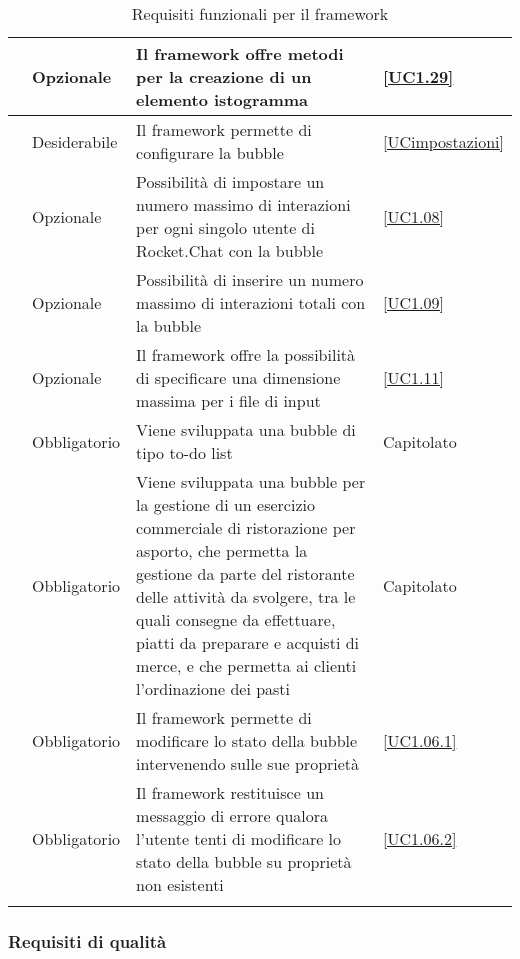 \begin{longtable}{|P{1.5cm}|P{2.5cm}|P{6.5cm}|P{2.5cm}|}
	\hline \RequisitoOpF\label{L64} & Opzionale & Il framework offre metodi per la creazione di un elemento istogramma &\ref{UC1.29} \\	 	 
	\hline \RequisitoDF\label{L93} & Desiderabile & Il framework permette di configurare la bubble & \ref{UCimpostazioni} \\
	\hline \RequisitoOpF\label{L47} & Opzionale & Possibilità di impostare un numero massimo di interazioni per ogni singolo utente di Rocket.Chat con la bubble & \ref{UC1.08} \\
	\hline \RequisitoOpF\label{L48} & Opzionale & Possibilità di inserire un numero massimo di interazioni totali con la bubble & \ref{UC1.09} \\
	\hline \RequisitoOpF\label{L49} & Opzionale & Il framework offre la possibilità di specificare una dimensione massima per i file di input & \ref{UC1.11} \\
	\hline \RequisitoObF\label{L3} & Obbligatorio & Viene sviluppata una bubble di tipo to-do list & Capitolato \\
	\hline \RequisitoObF\label{L4} & Obbligatorio & Viene sviluppata una bubble per la gestione di un esercizio commerciale di ristorazione per asporto, che permetta la gestione da parte del ristorante delle attività da svolgere, tra le quali consegne da effettuare, piatti da preparare e acquisti di merce, e che permetta ai clienti l'ordinazione dei pasti & Capitolato \\
	\hline \RequisitoObF\label{L90} & Obbligatorio & Il framework permette di modificare lo stato della bubble intervenendo sulle sue proprietà & \ref{UC1.06.1} \\
	\hline \RequisitoObF\label{L91} & Obbligatorio & Il framework restituisce un messaggio di errore qualora l'utente tenti di modificare lo stato della bubble su proprietà non esistenti & \ref{UC1.06.2} \\
	\hline
	\caption{Requisiti funzionali per il framework}
\end{longtable}

\subsubsection{Requisiti di qualità}

